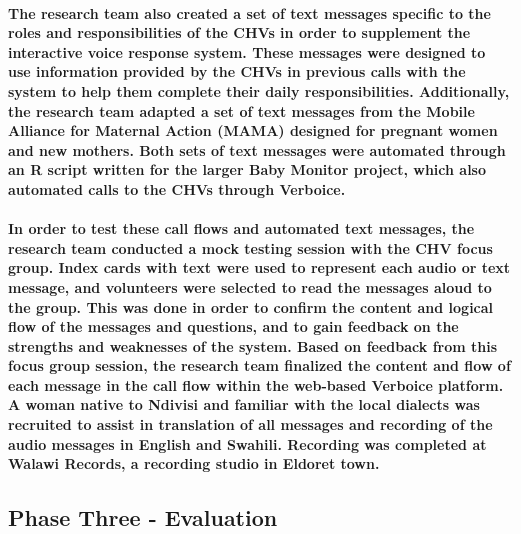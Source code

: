 \paragraph{The research team also created a set of text messages specific to the roles and responsibilities of the CHVs in order to supplement the interactive voice response system. These messages were designed to use information provided by the CHVs in previous calls with the system to help them complete their daily responsibilities. Additionally, the research team adapted a set of text messages from the Mobile Alliance for Maternal Action (MAMA) designed for pregnant women and new mothers. Both sets of text messages were automated through an R script written for the larger Baby Monitor project, which also automated calls to the CHVs through Verboice.}

\paragraph{In order to test these call flows and automated text messages, the research team conducted a mock testing session with the CHV focus group. Index cards with text were used to represent each audio or text message, and volunteers were selected to read the messages aloud to the group. This was done in order to confirm the content and logical flow of the messages and questions, and to gain feedback  on the strengths and weaknesses of the system. Based on feedback from this focus group session, the research team finalized the content and flow of each message in the call flow within the web-based Verboice platform. A woman native to Ndivisi and familiar with the local dialects was recruited to assist in translation of all messages and recording of the audio messages in English and Swahili. Recording was completed at Walawi Records, a recording studio in Eldoret town.}


\subsection{Phase Three - Evaluation}
